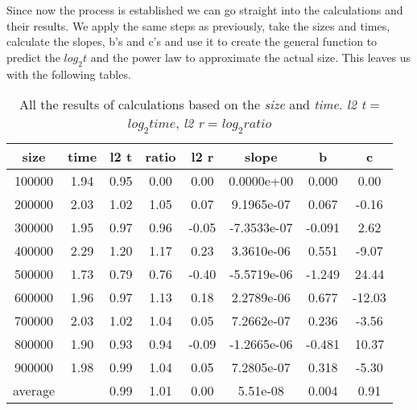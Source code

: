 \documentclass[12pt]{article}
\begin{document}
Since now the process is established we can go straight into the calculations and their results.
We apply the same steps as previously, take the sizes and times, calculate the slopes, b's and c's
and use it to create the general function to predict the $log_2 t$ and the power law to approximate
the actual size. This leaves us with the following tables.

\begin{table}[h]
    \centering
    \begin{tabular}{|c|c|c|c|c|c|c|c|}
        \hline size &	time &	l2 t &	ratio &	l2 r &	slope &	b &	c \\
        \hline 100000 &	1.94 &	0.95 &	0.00 &	0.00 &	0.0000e+00 &	0.000 &	0.00 \\
        \hline 200000 &	2.03 &	1.02 &	1.05 &	0.07 &	9.1965e-07 &	0.067 &	-0.16 \\
        \hline 300000 &	1.95 &	0.97 &	0.96 &	-0.05 &	-7.3533e-07 &	-0.091 &	2.62 \\
        \hline 400000 &	2.29 &	1.20 &	1.17 &	0.23 &	3.3610e-06 &	0.551 &	-9.07 \\
        \hline 500000 &	1.73 &	0.79 &	0.76 &	-0.40 &	-5.5719e-06 &	-1.249 &	24.44 \\
        \hline 600000 &	1.96 &	0.97 &	1.13 &	0.18 &	2.2789e-06 &	0.677 &	-12.03 \\
        \hline 700000 &	2.03 &	1.02 &	1.04 &	0.05 &	7.2662e-07 &	0.236 &	-3.56 \\
        \hline 800000 &	1.90 &	0.93 &	0.94 &	-0.09 &	-1.2665e-06 &	-0.481 &	10.37 \\
        \hline 900000 &	1.98 &	0.99 &	1.04 &	0.05 &	7.2805e-07 &	0.318 &	-5.30 \\
        \hline average &	& 0.99 &	1.01 &	0.00 &	5.51e-08 &	0.004 &	0.91 \\
        \hline
    \end{tabular}
    \caption{\small{All the results of calculations based on the \emph{size} and \emph{time}. \emph{l2 t} = \emph{$log_2 time$}, \emph{l2 r} = \emph{$log_2 ratio$}}}
    \label{tab:quickunion}
\end{table}

\noindent
\end{document}
